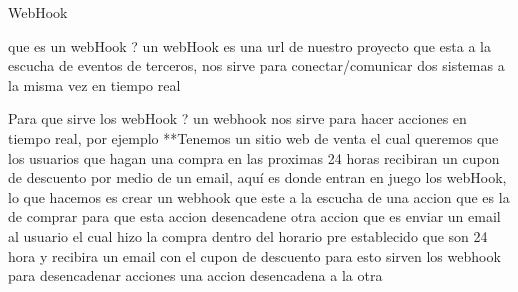 WebHook

que es un webHook ? 
    un webHook es una url de nuestro proyecto que esta a la escucha de eventos de terceros, nos sirve para 
    conectar/comunicar dos sistemas a la misma vez en tiempo real

Para que sirve los webHook ?
    un webhook nos sirve para hacer acciones en tiempo real, por ejemplo
    **Tenemos un sitio web de venta el cual queremos que los usuarios que hagan una compra en las 
    proximas 24 horas recibiran un cupon de descuento por medio de un email, aquí es donde entran en 
    juego los webHook, lo que hacemos es crear un webhook que este a la escucha de una accion que es la de 
    comprar para que esta accion desencadene otra accion que es enviar un email al usuario el cual hizo la compra dentro 
    del horario pre establecido que son 24 hora y recibira un email con el cupon de descuento 
    para esto sirven los webhook para desencadenar acciones una accion desencadena a la otra 
 